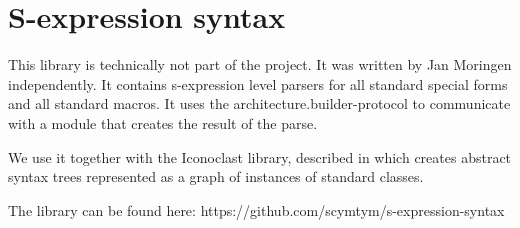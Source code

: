 \chapter{S-expression syntax}
\label{chap-s-expression-syntax}

This library is technically not part of the \sysname{} project.  It
was written by Jan Moringen independently.  It contains s-expression
level parsers for all standard special forms and all standard macros.
It uses the architecture.builder-protocol to communicate with a module
that creates the result of the parse.

We use it together with the Iconoclast library, described in
 which creates abstract syntax trees represented as
a graph of instances of standard classes.

The library can be found here:
https://github.com/scymtym/s-expression-syntax 
